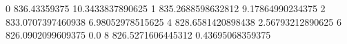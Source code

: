 0 836.43359375 10.3433837890625
1 835.2688598632812 9.17864990234375
2 833.0707397460938 6.98052978515625
4 828.6581420898438 2.56793212890625
6 826.0902099609375 0.0
8 826.5271606445312 0.43695068359375
